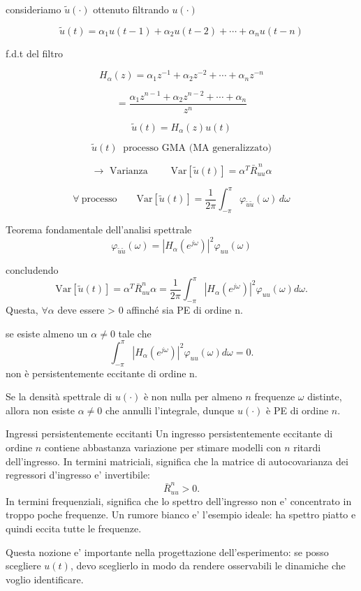 \documentclass[11pt,a4paper]{article}
\begin{document}
consideriamo $\tilde u(\cdot)$ ottenuto filtrando $u(\cdot)$

\[
\tilde u(t)=\alpha_1u(t-1)+\alpha_2u(t-2)+\cdots+\alpha_nu(t-n)
\]

f.d.t del filtro

\[
H_\alpha(z)=\alpha_1z^{-1}+\alpha_2z^{-2}+\cdots+\alpha_nz^{-n}
\]

\[
=
\frac{\alpha_1z^{n-1}+\alpha_2z^{n-2}+\cdots+\alpha_n}{z^n}
\]

\[
\tilde u(t)=H_\alpha(z)u(t)
\]

\[
\tilde u(t)\ \text{ processo GMA (MA generalizzato)}
\]

\[
\to \text{ Varianza }\qquad
\mathrm{Var}[\tilde u(t)]
=
\alpha^{T}\bar R^{\,n}_{uu}\alpha
\]

\[
\forall\ \text{processo}
\qquad
\mathrm{Var}[\tilde u(t)]
=
\frac{1}{2\pi}\int_{-\pi}^{\pi}\varphi_{\tilde u\tilde u}(\omega)\,d\omega
\]

Teorema fondamentale dell'analisi spettrale 
\[
\varphi_{\tilde u\tilde u}(\omega)
=
|H_\alpha(e^{j\omega})|^2\varphi_{uu}(\omega)
\]

concludendo
\[
\mathrm{Var}[\tilde u(t)]=\alpha^T\bar R_{uu}^{n} \alpha=\frac{1}{2\pi}\int_{-\pi}^{\pi}|H_\alpha(e^{j\omega})|^2\varphi_{uu}(\omega)d\omega.
\]
Questa, $\forall \alpha$ deve essere > 0 affinché sia PE di ordine n.

se esiste almeno un $\alpha\neq 0$ tale che 
\[
\int_{-\pi}^{\pi}|H_\alpha(e^{j\omega})|^2\varphi_{uu}(\omega)d\omega = 0.
\]
non è persistentemente eccitante di ordine n.

Se la densità spettrale di $u(\cdot)$ è non nulla per almeno $n$ frequenze $\omega$ distinte, allora non esiste $\alpha\neq 0$ che annulli l'integrale, dunque $u(\cdot)$ è PE di ordine $n$.

\begin{spiegazione}{Ingressi persistentemente eccitanti}
Un ingresso persistentemente eccitante di ordine $n$ contiene abbastanza variazione per stimare modelli con $n$ ritardi dell'ingresso. In termini matriciali, significa che la matrice di autocovarianza dei regressori d'ingresso e' invertibile:
\[
\bar R_{uu}^{n}>0.
\]
In termini frequenziali, significa che lo spettro dell'ingresso non e' concentrato in troppo poche frequenze. Un rumore bianco e' l'esempio ideale: ha spettro piatto e quindi eccita tutte le frequenze.

Questa nozione e' importante nella progettazione dell'esperimento: se posso scegliere $u(t)$, devo sceglierlo in modo da rendere osservabili le dinamiche che voglio identificare.
\end{spiegazione}
\end{document}
